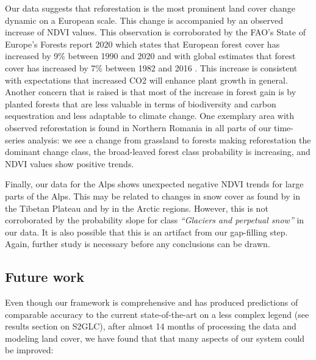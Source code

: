 Our data suggests that reforestation is the most prominent land cover change dynamic on a European scale. This change is accompanied by an observed increase of NDVI values. This observation is corroborated by the FAO's State of Europe’s Forests report 2020 which states that European forest cover has increased by 9\% between 1990 and 2020 \citep{rasi2020SoEF} and with global estimates that forest cover has increased by 7\% between 1982 and 2016 \citep{song2018global}. This increase is consistent with expectations that increased CO2 will enhance plant growth in general. Another concern that is raised is that most of the increase in forest gain is by planted forests \citep{payn2015changes} that are less valuable in terms of biodiversity and carbon sequestration \citep{liu2018tree} and less adaptable to climate change. One exemplary area with observed reforestation is found in Northern Romania in all parts of our time-series analysis: we see a change from grassland to forests making reforestation the dominant change class, the broad-leaved forest class probability is increasing, and NDVI values show positive trends. 
        
Finally, our data for the Alps shows unexpected negative NDVI trends for large parts of the Alps. This may be related to changes in snow cover as found by \citet{wang2018snow} in the Tibetan Plateau and by \citet{buus2006snow} in the Arctic regions. However, this is not corroborated by the probability slope for class \emph{``Glaciers and perpetual snow''} in our data. It is also possible that this is an artifact from our gap-filling step. Again, further study is necessary before any conclusions can be drawn.

\subsection*{Future work}
    
Even though our framework is comprehensive and has produced predictions of comparable accuracy to the current state-of-the-art on a less complex legend (see results section on S2GLC), after almost 14 months of processing the data and modeling land cover, we have found that that many aspects of our system could be improved:

